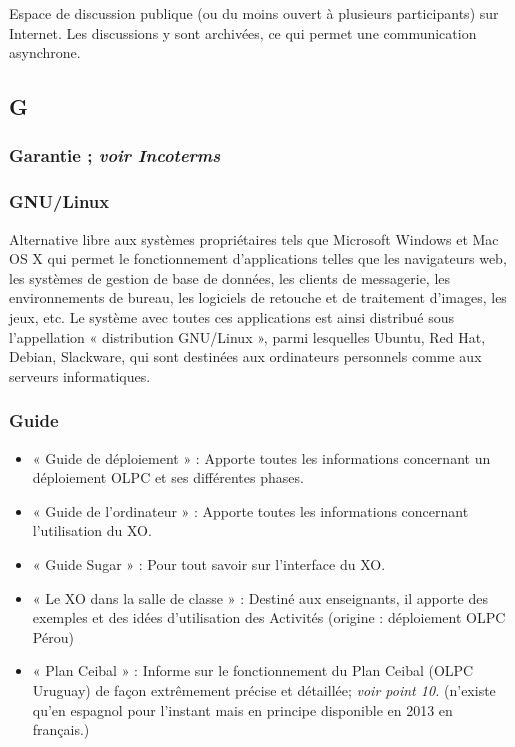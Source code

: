 \documentclass[12pt]{article}
\begin{document}
Espace de discussion publique (ou du moins ouvert à plusieurs participants)
sur Internet. Les discussions y sont archivées, ce qui permet une
communication asynchrone.
\subsection{G}
\label{sec-14-7}
\subsubsection{Garantie ; \emph{voir Incoterms}}
\label{sec-14-7-1}
\subsubsection{GNU/Linux}
\label{sec-14-7-2}


Alternative libre aux systèmes propriétaires tels que Microsoft Windows et
Mac OS X qui permet le fonctionnement d'applications telles que les
navigateurs web, les systèmes de gestion de base de données, les clients de
messagerie, les environnements de bureau, les logiciels de retouche et de
traitement d'images, les jeux, etc.  Le système avec toutes ces
applications est ainsi distribué sous l'appellation « distribution
GNU/Linux », parmi lesquelles Ubuntu, Red Hat, Debian, Slackware, qui sont
destinées aux ordinateurs personnels comme aux serveurs informatiques.
\subsubsection{Guide}
\label{sec-14-7-3}


\begin{itemize}
\item « Guide de déploiement » : Apporte toutes les informations concernant un
  déploiement OLPC et ses différentes phases.
\item « Guide de l'ordinateur » : Apporte toutes les informations concernant
  l'utilisation du XO.
\item « Guide Sugar » : Pour tout savoir sur l'interface du XO.
\item « Le XO dans la salle de classe » : Destiné aux enseignants, il apporte
  des exemples et des idées d'utilisation des Activités (origine :
  déploiement OLPC Pérou)
\item « Plan Ceibal » : Informe sur le fonctionnement du Plan Ceibal (OLPC
  Uruguay) de façon extrêmement précise et détaillée; \emph{voir point 10.}
  (n'existe qu'en espagnol pour l'instant mais en principe disponible en
  2013 en français.)
\end{itemize}
\end{document}
